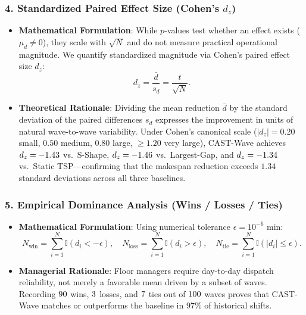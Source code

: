 \documentclass[11pt,a4paper]{article}
\begin{document}
\subsubsection{4. Standardized Paired Effect Size (Cohen's $d_z$)}
\begin{itemize}[leftmargin=*]
    \item \textbf{Mathematical Formulation}: While $p$-values test whether an effect exists ($\mu_d \neq 0$), they scale with $\sqrt{N}$ and do not measure practical operational magnitude. We quantify standardized magnitude via Cohen's paired effect size $d_z$:
    \begin{equation}
        d_z = \frac{\bar{d}}{s_d} = \frac{t}{\sqrt{N}}.
    \end{equation}
    \item \textbf{Theoretical Rationale}: Dividing the mean reduction $\bar{d}$ by the standard deviation of the paired differences $s_d$ expresses the improvement in units of natural wave-to-wave variability. Under Cohen's canonical scale ($|d_z| = 0.20$ small, $0.50$ medium, $0.80$ large, $\ge 1.20$ very large), CAST-Wave achieves $d_z = -1.43$ vs.\ S-Shape, $d_z = -1.46$ vs.\ Largest-Gap, and $d_z = -1.34$ vs.\ Static TSP---confirming that the makespan reduction exceeds $1.34$ standard deviations across all three baselines.
\end{itemize}

\subsubsection{5. Empirical Dominance Analysis (Wins / Losses / Ties)}
\begin{itemize}[leftmargin=*]
    \item \textbf{Mathematical Formulation}: Using numerical tolerance $\epsilon = 10^{-6}\text{ min}$:
    \begin{equation}
        N_{\text{win}} = \sum_{i=1}^N \mathbb{I}(d_i < -\epsilon), \quad N_{\text{loss}} = \sum_{i=1}^N \mathbb{I}(d_i > \epsilon), \quad N_{\text{tie}} = \sum_{i=1}^N \mathbb{I}(|d_i| \le \epsilon).
    \end{equation}
    \item \textbf{Managerial Rationale}: Floor managers require day-to-day dispatch reliability, not merely a favorable mean driven by a subset of waves. Recording $90$ wins, $3$ losses, and $7$ ties out of $100$ waves proves that CAST-Wave matches or outperforms the baseline in $97\%$ of historical shifts.
\end{itemize}
\end{document}
